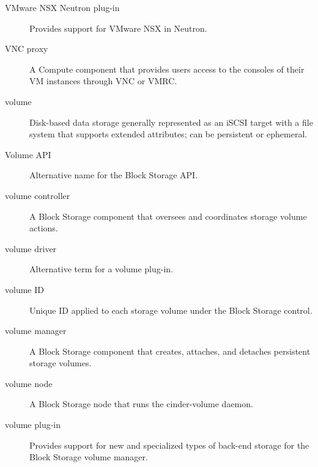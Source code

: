 \documentclass[letterpaper,10pt,english]{sphinxmanual}
\begin{document}
\begin{description}
\item[{VMware NSX Neutron plug-in}] \leavevmode{}\label{_source/glossary:term-vmware-nsx-neutron-plug-in}
Provides support for VMware NSX in Neutron.

\item[{VNC proxy}] \leavevmode{}\label{_source/glossary:term-vnc-proxy}
A Compute component that provides users access to the consoles
of their VM instances through VNC or VMRC.

\item[{volume}] \leavevmode{}\label{_source/glossary:term-volume}
Disk-based data storage generally represented as an iSCSI target
with a file system that supports extended attributes; can be
persistent or ephemeral.

\item[{Volume API}] \leavevmode{}\label{_source/glossary:term-volume-api}
Alternative name for the Block Storage API.

\item[{volume controller}] \leavevmode{}\label{_source/glossary:term-volume-controller}
A Block Storage component that oversees and coordinates storage
volume actions.

\item[{volume driver}] \leavevmode{}\label{_source/glossary:term-volume-driver}
Alternative term for a volume plug-in.

\item[{volume ID}] \leavevmode{}\label{_source/glossary:term-volume-id}
Unique ID applied to each storage volume under the Block Storage
control.

\item[{volume manager}] \leavevmode{}\label{_source/glossary:term-volume-manager}
A Block Storage component that creates, attaches, and detaches
persistent storage volumes.

\item[{volume node}] \leavevmode{}\label{_source/glossary:term-volume-node}
A Block Storage node that runs the cinder-volume daemon.

\item[{volume plug-in}] \leavevmode{}\label{_source/glossary:term-volume-plug-in}
Provides support for new and specialized types of back-end
storage for the Block Storage volume manager.


\end{description}
\end{document}
